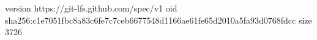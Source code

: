 version https://git-lfs.github.com/spec/v1
oid sha256:c1e7051fbc8a83c6fe7c7ceb6677548d1166ae61fe65d2010a5fa93d0768fdcc
size 3726
